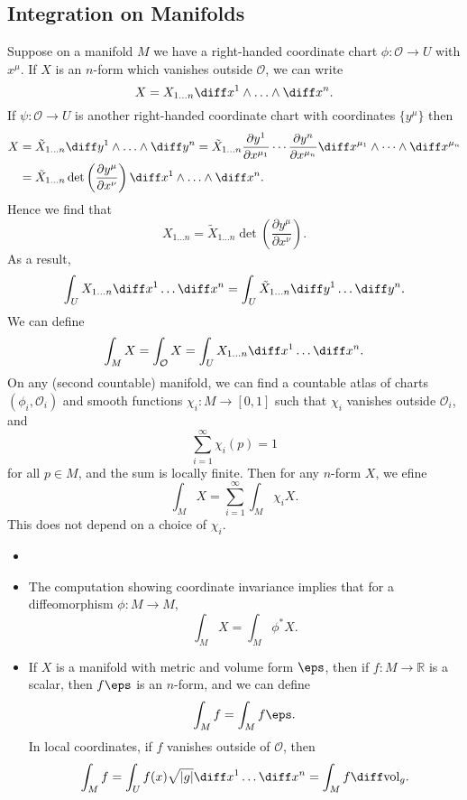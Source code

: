 \documentclass[12pt]{article}
\begin{document}
\subsection{Integration on Manifolds}%
\label{sub:int}

Suppose on a manifold $M$ we have a right-handed coordinate chart $\phi : \mathcal{O} \to U$ with $x^\mu$. If $X$ is an $n$-form which vanishes outside $\mathcal{O}$, we can write
\[
X = X_{1 \ldots n} \diff x^1 \wedge \ldots \wedge \diff x^n.
\]
If $\psi : \mathcal{O} \to U$ is another right-handed coordinate chart with coordinates $\{y^\mu\}$ then
\begin{align*}
	X &= \tilde X_{1 \ldots n} \diff y^1 \wedge \ldots \wedge \diff y^n = \tilde X_{1 \ldots n} \frac{\partial y^1}{\partial x^{\mu_1}} \cdots \frac{\partial y^n}{\partial x^{\mu_n}} \diff x^{\mu_1} \wedge \cdots \wedge \diff x^{\mu_n} \\
	  &= \tilde X_{1 \ldots n} \det \left( \frac{\partial y^\mu}{\partial x^\nu} \right) \diff x^1 \wedge \ldots \wedge \diff x^n.
\end{align*}
Hence we find that
\[
X_{1 \ldots n} = \tilde X_{1 \ldots n} \det \left( \frac{\partial y^\mu}{\partial x^\nu} \right).
\]
As a result,
\[
\int_{U} X_{1 \ldots n} \diff x^1 \ldots \diff x^n = \int_U \tilde X_{1\ldots n} \diff y^1 \ldots \diff y^n.
\]
We can define
\[
\int_M X = \int_\mathcal{O} X = \int_U X_{1 \ldots n} \diff x^1 \ldots \diff x^n. 
\]
On any (second countable) manifold, we can find a countable atlas of charts $(\phi_i, \mathcal{O}_i)$ and smooth functions $\chi_i : M \to [0, 1]$ such that $\chi_i$ vanishes outside $\mathcal{O}_i$, and
\[
\sum_{i = 1}^\infty \chi_i(p) = 1
\]
for all $p \in M$, and the sum is locally finite. Then for any $n$-form $X$, we efine
\[
\int_M X = \sum_{i = 1}^\infty \int_M \chi_i X.
\]
This does not depend on a choice of $\chi_i$.

\begin{remark}
	\begin{itemize}
		\item[]
		\item The computation showing coordinate invariance implies that for a diffeomorphism $\phi : M \to M$,
			\[
			\int_M X = \int_M \phi^{\ast} X.
			\]
		\item If $X$ is a manifold with metric and volume form $\eps$, then if $f : M \to \mathbb{R}$ is a scalar, then $f \eps$ is an $n$-form, and we can define
			\[
			\int_M f = \int_M f\eps.
			\]
			In local coordinates, if $f$ vanishes outside of $\mathcal{O}$, then
			\[
				\int_M f = \int_U f(x) \sqrt{|g|} \diff x^1 \ldots \diff x^n = \int_M f \diff \mathrm{vol}_g.
			\]
	\end{itemize}
\end{remark}
\end{document}
